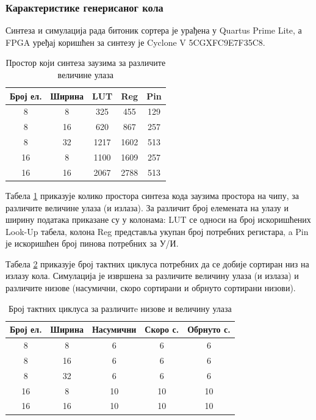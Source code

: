 \documentclass[12pt, a4paper]{article}
\theoremstyle{definition}
\begin{document}
\subsubsection{Карактеристике генерисаног кола}
Синтеза и симулација рада битоник сортера је урађена у Quartus Prime Lite, а FPGA уређај коришћен за синтезу је Cyclone V 5CGXFC9E7F35C8.
\begin{table}[H]
\centering
 \begin{tabular}{| c | c | c c c |}
  \hline
  Број ел. & Ширина & LUT & Reg & Pin \\
  \hline
  8 & 8  & 325 & 455 & 129 \\
  8 & 16 & 620 & 867 & 257 \\
  8 & 32 & 1217 & 1602 & 513 \\
  \hline
  16 & 8 & 1100 & 1609 & 257 \\
  16 & 16 & 2067 & 2788 & 513 \\
  \hline
 \end{tabular}
 \caption{Простор који синтеза заузима за различите величине улаза}
 \label{tab:cipSinteza}
\end{table}
Табела \ref{tab:cipSinteza} приказује колико простора синтеза кода заузима простора на чипу, за различите величине улаза (и излаза). За различит број елемената на улазу и ширину података приказане су у колонама: LUT се односи на број искоришћених Look-Up табела, колона Reg представља укупан број потребних регистара, a Pin је искоришћен број пинова потребних за У/И.

Табела \ref{tab:sim} приказује број тактних циклуса потребних да се добије сортиран низ на излазу кола. Симулација је извршена за различите величину улаза (и излаза) и различите низове (насумични, скоро сортирани и обрнуто сортирани низови).

\begin{table}[H]
\centering
 \begin{tabular}{| c | c | c c c |}
  \hline
  Број ел. & Ширина & Насумични & Скоро с. & Обрнуто с. \\
  \hline
  8 & 8  & 6 & 6 & 6 \\
  8 & 16 & 6 & 6 & 6 \\
  8 & 32 & 6 & 6 & 6 \\
  \hline
  16 & 8 & 10 & 10 & 10 \\
  16 & 16 & 10 & 10 & 10 \\
  \hline
 \end{tabular}
 \caption{Број тактних циклуса за различитe низове и величину улаза}
 \label{tab:sim}
\end{table}
\end{document}
